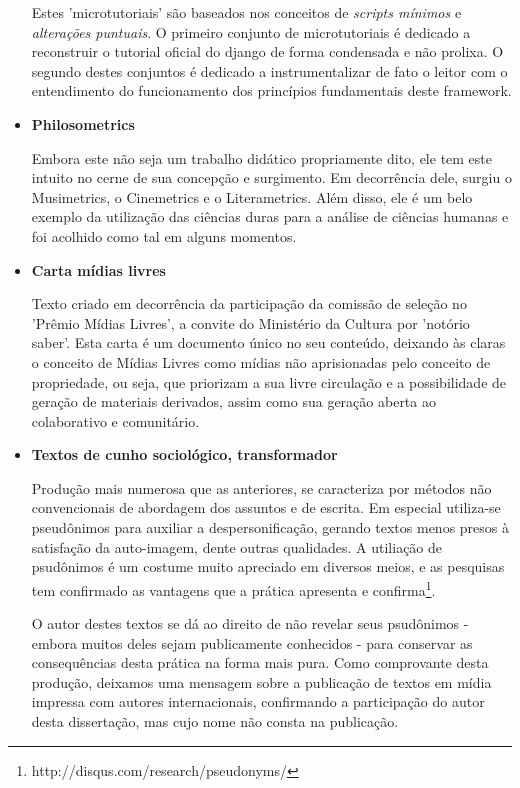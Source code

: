 \begin{itemize}
Estes 'microtutoriais' são baseados nos conceitos de \emph{scripts mínimos} e
\emph{alterações puntuais}. O primeiro conjunto de microtutoriais é dedicado
a reconstruir o tutorial oficial do django de forma condensada e não prolixa.
O segundo destes conjuntos é dedicado a instrumentalizar de fato o leitor com
o entendimento do funcionamento dos princípios fundamentais deste framework.

    \item {\bf Philosometrics}

Embora este não seja um trabalho didático propriamente dito, ele tem este intuito
no cerne de sua concepção e surgimento. Em decorrência dele, surgiu o  Musimetrics,
o Cinemetrics e o Literametrics. Além disso, ele é um belo exemplo da
utilização das ciências duras para a análise de ciências humanas e foi acolhido
como tal em alguns momentos.

    \item {\bf Carta mídias livres}

Texto criado em decorrência da participação da comissão de seleção no
'Prêmio Mídias Livres', a convite do Ministério da Cultura por 'notório saber'.
Esta carta é um documento único no seu conteúdo, deixando às claras
o conceito de Mídias Livres como mídias não aprisionadas pelo conceito
de propriedade, ou seja, que priorizam a sua livre circulação e a possibilidade
de geração de materiais derivados, assim como sua geração aberta ao colaborativo e comunitário.

    \item {\bf Textos de cunho sociológico, transformador}

Produção mais numerosa que as anteriores, se caracteriza por métodos não convencionais
de abordagem dos assuntos e de escrita. Em especial utiliza-se pseudônimos para
auxiliar a despersonificação, gerando textos menos presos à satisfação da auto-imagem, dente
outras qualidades. A utiliação de psudônimos é um costume muito apreciado em diversos meios,
e as pesquisas tem confirmado as vantagens que a prática apresenta e confirma\footnote{http://disqus.com/research/pseudonyms/}.

O autor destes textos se dá ao direito de não revelar seus psudônimos - embora muitos deles
sejam publicamente conhecidos - para conservar as consequências desta prática na
forma mais pura. Como comprovante desta produção, deixamos uma mensagem sobre a publicação
de textos em mídia impressa com autores internacionais,
confirmando a participação do autor desta dissertação, mas cujo
nome não consta na publicação.


\end{itemize}
